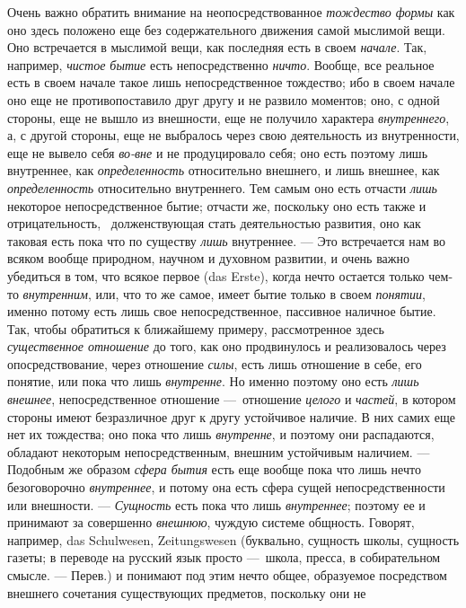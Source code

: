 Очень важно обратить внимание на неопосредствованное
{\em тождество формы} как оно здесь положено еще без
содержательного движения самой мыслимой вещи. Оно встречается в мыслимой
вещи, как последняя есть в своем {\em начале}. Так,
например, {\em чистое бытие} есть непосредственно
{\em ничто}. Вообще, все реальное есть в своем начале
такое лишь непосредственное тождество; ибо в своем начале оно еще не
противопоставило друг другу и не развило моментов; оно, с одной стороны,
еще не вышло из внешности, еще не получило характера
{\em внутреннего}, а, с другой стороны, еще не
выбралось через свою деятельность из внутренности, еще не вывело себя
{\em во-вне} и не продуцировало себя; оно есть поэтому
лишь внутреннее, как {\em определенность} относительно
внешнего, и лишь внешнее, как {\em определенность}
относительно внутреннего. Тем самым оно есть отчасти
{\em лишь} некоторое непосредственное бытие; отчасти
же, поскольку оно есть также и отрицательность, \ долженствующая стать
деятельностью развития, оно как таковая есть пока что по существу
{\em лишь} внутреннее. — Это встречается нам во всяком
вообще природном, научном и духовном развитии, и очень важно убедиться в
том, что всякое первое (das Erste), когда нечто остается только чем-то
{\em внутренним}, или, что то же самое, имеет бытие
только в своем {\em понятии}, именно потому есть лишь
свое непосредственное, пассивное наличное бытие. Так, чтобы обратиться к
ближайшему примеру, рассмотренное здесь
{\em существенное отношение} до того, как оно
продвинулось и реализовалось через опосредствование, через отношение
{\em силы}, есть лишь отношение в себе, его понятие,
или пока что лишь {\em внутренне}. Но именно поэтому
оно есть {\em лишь внешнее}, непосредственное отношение
—~отношение {\em целого} и
{\em частей}, в котором стороны имеют безразличное друг
к другу устойчивое наличие. В них самих еще нет их тождества; оно пока что
лишь {\em внутренне}, и поэтому они распадаются,
обладают некоторым непосредственным, внешним устойчивым наличием. —
Подобным же образом {\em сфера бытия} есть еще вообще
пока что лишь нечто безоговорочно {\em внутреннее}, и
потому она есть сфера сущей непосредственности или внешности. —
{\em Сущность} есть пока что лишь
{\em внутреннее}; поэтому ее и принимают за совершенно
{\em внешнюю}, чуждую системе общность. Говорят,
например, das Schulwesen, Zeitungswesen (буквально, сущность школы,
сущность газеты; в переводе на русский язык просто —~школа, пресса, в
собирательном смысле. — Перев.) и понимают под этим нечто общее, образуемое
посредством внешнего сочетания существующих предметов, поскольку они не
